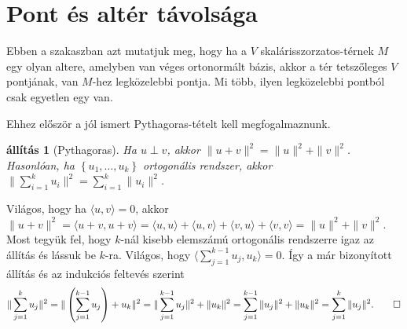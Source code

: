 \documentclass[a4paper, showtrims]{memoir}
\makeatletter
\renewenvironment{proof}[1][\proofname]
    {\par\pushQED{\qed}%
    \normalfont \topsep6\p@\@plus6\p@\relax
    \trivlist
    \item[\hskip\labelsep
        \itshape
    #1\@addpunct{:}]\ignorespaces}
    {\popQED\endtrivlist\@endpefalse}
\theoremstyle{plain}
\newtheorem{proposition}{állítás}[chapter]
\theoremstyle{remark}
\theoremstyle{definition}
\newcommand{\ip}[2]{\langle#1,#2\rangle}
\makeatother
\begin{document}
\section{Pont és altér távolsága}
Ebben a szakaszban azt mutatjuk meg, hogy ha a $V$ skalárisszorzatos-térnek $M$ egy olyan
altere, amelyben van véges ortonormált bázis, akkor a tér tetszőleges $V$ pontjának,
van $M$-hez legközelebbi pontja.
Mi több, ilyen legközelebbi pontból csak egyetlen egy van.

Ehhez először a jól ismert Pythagoras-tételt kell megfogalmaznunk.

\begin{proposition}[Pythagoras]
	Ha $u\perp v$, akkor $\|u+v\|^2=\|u\|^2+\|v\|^2$.
	Hasonlóan, ha $\left\{ u_1,\ldots,u_k \right\}$ ortogonális rendszer, akkor
	$\|\sum_{i=1}^ku_i\|^2=\sum_{i=1}^k\|u_i\|^2$.
\end{proposition}
\begin{proof}
	Világos, hogy ha $\ip{u}{v}=0$,
	akkor
	\begin{math}
		\|u+v\|^2
		=
		\ip{u+v}{u+v}
		=\ip{u}{u}+\ip{u}{v}+\ip{v}{u}+\ip{v}{v}
		=
		\|u\|^2+\|v\|^2.
	\end{math}
	Most tegyük fel, hogy $k$-nál kisebb elemszámú ortogonális rendszerre igaz az állítás
	és lássuk be $k$-ra.
	Világos, hogy
	\begin{math}
		\ip{\sum_{j=1}^{k-1}u_j}{u_k}=0.
	\end{math}
	Így a már bizonyított állítás és az indukciós feltevés szerint
	\[
		\|\sum_{j=1}^ku_j\|^2
		=
		\|\left( \sum_{j=1}^{k-1}u_j \right)+u_k\|^2
		=
		\|\sum_{j=1}^{k-1}u_j\|^2+\|u_k\|^2
		=
		\sum_{j=1}^{k-1}\|u_j\|^2+\|u_k\|^2
		=
		\sum_{j=1}^k\|u_j\|^2.
		\qedhere
	\]
\end{proof}
\end{document}
